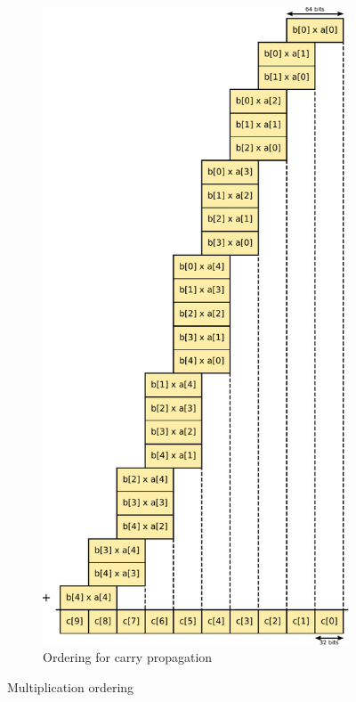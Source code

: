 \documentclass[12pt, a4paper]{report}
\begin{document}
\begin{figure}
\begin{subfigure}[h]{0.5\textwidth}
        \end{subfigure}%
        ~ %
        \begin{subfigure}[h]{0.5\textwidth}
                \centering
                \includegraphics[width=\textwidth]{figs/multiplication_order_for_carry_propagation}
                \caption{Ordering for carry propagation}
                \label{fig:gpu_multiplication_ordering}
        \end{subfigure}
        \caption{Multiplication ordering}\label{fig:multiplication_ordering}
\end{figure}
\end{document}
